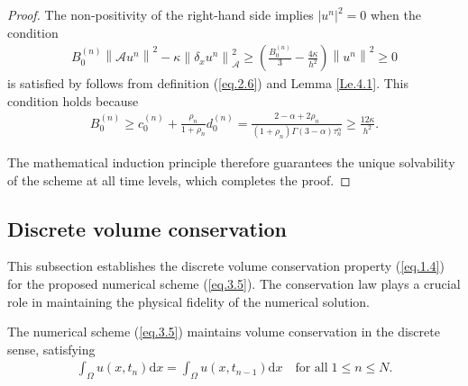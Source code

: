 \documentclass{siamart171218}
\theoremstyle{remark}
\theoremstyle{example}
\numberwithin{equation}{section}
\begin{document}
\begin{proof}
The non-positivity of the right-hand side implies $|u^{n}|^2 = 0$ when the condition
\begin{align*}
    B_{0}^{(n)} \left\|\mathscr{A} u^n\right\|^2
    - \kappa \left\|\delta_x u^{n}\right\|_\mathcal{A}^2
    \geq \left(\frac{B_{0}^{(n)}}{3}
    - \frac{4\kappa}{h^2}\right) \left\|u^{n}\right\|^2 \geq 0
\end{align*}
is satisfied by follows from definition (\ref{eq.2.6}) and Lemma \ref{Le.4.1}. This condition holds because
\begin{align*}
    B_0^{(n)} \geq c_0^{(n)} + \frac{\rho_n}{1+\rho_n} d_0^{(n)} = \frac{2-\alpha+2\rho_n}{(1+\rho_n)\Gamma(3-\alpha)\tau_n^\alpha} \geq \frac{12\kappa}{h^2}.
\end{align*}

The mathematical induction principle therefore guarantees the unique solvability of the scheme at all time levels, which completes the proof.
\end{proof}

\subsection{Discrete volume conservation}\label{sec: Discrete volume conservation property}
This subsection establishes the discrete volume conservation property (\ref{eq.1.4}) for the proposed numerical scheme (\ref{eq.3.5}). The conservation law plays a crucial role in maintaining the physical fidelity of the numerical solution.

\begin{theorem}\label{Th.4.3}
The numerical scheme (\ref{eq.3.5}) maintains volume
conservation in the discrete sense, satisfying
\begin{align*}
\int_\Omega u(x,t_n)\mathrm{d}x =
\int_\Omega u(x,t_{n-1})\mathrm{d}x \quad \text{for all} \; 1\leq n\leq N.
\end{align*}
\end{theorem}
\end{document}
